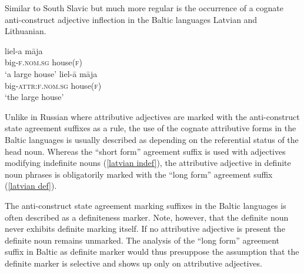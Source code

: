 Similar to South Slavic but much more regular is the occurrence of a cognate anti\hyp{}construct adjective inflection in the Baltic languages Latvian and Lithuanian.
\begin{exe}
\ex
{}
\begin{xlist}
\ex	\label{latvian indef}
\gll liel-a māja\\
	big-\textsc{f.nom.sg} house(\textsc{f})\\
\glt	‘a large house’
\ex	\label{latvian def}
\gll liel-ā māja\\
	big-\textsc{attr:f.nom.sg} house(\textsc{f})\\
\glt	‘the large house’
\end{xlist}
\end{exe}
Unlike in Russian where attributive adjectives are marked with the anti\hyp{}construct state agreement suffixes as a rule, the use of the cognate attributive forms in the Baltic languages is usually described as depending on the referential status of the head noun. Whereas the “short form” agreement suffix is used with adjectives modifying indefinite nouns (\ref{latvian indef}), the attributive adjective in definite noun phrases is obligatorily marked with the “long form” agreement suffix (\ref{latvian def}).

The anti\hyp{}construct state agreement marking suffixes in the Baltic languages is often described as a definiteness marker. Note, however, that the definite noun never exhibits definite marking itself. If no attributive adjective is present the definite noun remains unmarked. The analysis of the “long form” agreement suffix in Baltic as definite marker would thus presuppose the assumption that the definite marker is selective and shows up only on attributive adjectives. 

